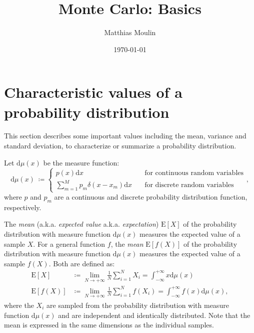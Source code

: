 \documentclass[10pt,a4paper]{article}
\title{Monte Carlo: Basics}
\author{Matthias Moulin}
\date{\today}
\numberwithin{equation}{section}
\begin{document}
\maketitle

\section{Characteristic values of a probability distribution}
\label{section:characteristicvalues}
This section describes some important values including the mean, variance and standard deviation, to characterize or summarize a probability distribution.

Let $\mathrm{d}\mu\left(x\right)$ be the measure function:
\begin{equation}
\mathrm{d}\mu\left(x\right)\ \coloneqq
\begin{cases}
p\left(x\right) \mathrm{d}x &\quad\text{for continuous random variables} \\
\sum_{m=1}^{M} p_{m} \delta\left(x - x_{m}\right) \mathrm{d}x &\quad\text{for discrete random variables} \
\end{cases},
\end{equation}
where $p$ and $p_{m}$ are a continuous and discrete probability distribution function, respectively.

The \textit{mean} (a.k.a. \textit{expected value} a.k.a. \textit{expectation}) $\mathrm{E}\left[X\right]$ of the probability distribution with measure function $\mathrm{d}\mu\left(x\right)$ measures the expected value of a sample $X$. For a general function $f$, the \textit{mean} $\mathrm{E}\left[f\left(X\right)\right]$ of the probability distribution with measure function $\mathrm{d}\mu\left(x\right)$ measures the expected value of a sample $f\left(X\right)$. Both are defined as:
\begin{align}
\label{equation:E}\mathrm{E}\left[X\right] 						&\coloneqq\lim_{N \to +\infty} \frac{1}{N} \sum_{i=1}^{N} X_{i} = \int_{-\infty}^{+\infty} x \mathrm{d}\mu\left(x\right) \\
\label{equation:Ef}\mathrm{E}\left[f\left(X\right)\right] 		&\coloneqq\lim_{N \to +\infty} \frac{1}{N} \sum_{i=1}^{N} f\left(X_{i}\right) = \int_{-\infty}^{+\infty} f\left(x\right) \mathrm{d}\mu\left(x\right),
\end{align}
where the $X_{i}$ are sampled from the probability distribution with measure function $\mathrm{d}\mu\left(x\right)$ and are independent and identically distributed. Note that the mean is expressed in the same dimensions as the individual samples.
\end{document}
